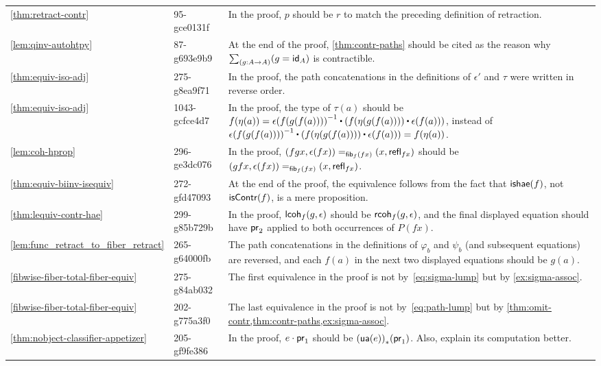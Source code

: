 \documentclass[
%
%
11pt %
]{article}
\begin{document}
\begin{longtable}{llp{10.5cm}}
  \cref{thm:retract-contr}
  & 95-gce0131f
  & In the proof, $p$ should be $r$ to match the preceding definition of retraction.\\
  \cref{lem:qinv-autohtpy}
  & 87-g693e9b9
  & At the end of the proof, \cref{thm:contr-paths} should be cited as the reason why $\sm{g:A\to A} (g = \idfunc[A])$ is contractible.\\
  \cref{thm:equiv-iso-adj}
  & 275-g8ea9f71
  & In the proof, the path concatenations in the definitions of $\epsilon'$ and $\tau$ were written in reverse order.\\
  \cref{thm:equiv-iso-adj}
  & 1043-gcfce4d7
  & In the proof, the type of $\tau(a)$ should be $\ap{f}{\eta(a)}=\opp{\epsilon(f(g(f(a))))}\ct (\ap{f}{\eta(g(f(a)))}\ct \epsilon(f(a)))$, instead of $\opp{\epsilon(f(g(f(a))))}\ct (\ap{f}{\eta(g(f(a)))}\ct \epsilon(f(a)))=\ap{f}{\eta(a)}$.\\
  \cref{lem:coh-hprop}
  & 296-ge3dc076
  & In the proof, $\id[\hfib{f}{fx}]{(fgx,\epsilon(fx))}{(x,\refl{fx})}$ should be $\id[\hfib{f}{fx}]{(gfx,\epsilon(fx))}{(x,\refl{fx})}$.\\
  \cref{thm:equiv-biinv-isequiv}
  & 272-gfd47093
  & At the end of the proof, the equivalence follows from the fact that $\ishae(f)$, not $\iscontr(f)$, is a mere proposition. \\
  \cref{thm:lequiv-contr-hae}
  & 299-g85b729b
  & In the proof, $\lcoh{f}{g}{\epsilon}$ should be $\rcoh{f}{g}{\epsilon}$, and the final displayed equation should have $\proj{2}$ applied to both occurrences of $P(fx)$.\\
  \cref{lem:func_retract_to_fiber_retract}
  & 265-g64000fb
  & The path concatenations in the definitions of $\varphi_b$ and $\psi_b$ (and subsequent equations) are reversed, and each $f(a)$ in the next two displayed equations should be $g(a)$.\\
  \cref{fibwise-fiber-total-fiber-equiv}
  & 275-g84ab032
  & The first equivalence in the proof is not by~\eqref{eq:sigma-lump} but by \cref{ex:sigma-assoc}.\\
  \cref{fibwise-fiber-total-fiber-equiv}
  & 202-g775a3f0
  & The last equivalence in the proof is not by~\eqref{eq:path-lump} but by \cref{thm:omit-contr,thm:contr-paths,ex:sigma-assoc}.\\
  \cref{thm:nobject-classifier-appetizer}
  & 205-gf9fe386
  & In the proof, $e\cdot \proj1$ should be $\trans{(\ua(e))}{\proj1}$.  Also, explain its computation better.\\

\end{longtable}
\end{document}

